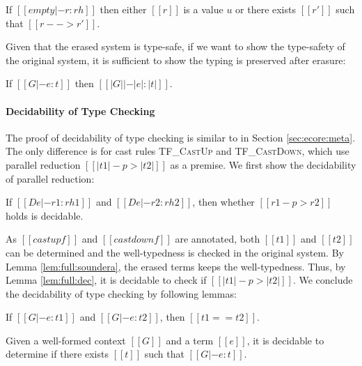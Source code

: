 \begin{theorem}\label{lem:full:prog}
  If $[[empty |- r:rh]]$ then either $[[r]]$ is a value $u$ or there
  exists $[[r']]$ such that $[[r --> r']]$.
\end{theorem}

Given that the erased system is type-safe, if we want to show the
type-safety of the original system, it is sufficient to show the typing
is preserved after erasure:

\begin{lemma}\label{lem:full:soundera}
If $[[G |- e : t]]$ then $[[|G| |- |e| : |t|]]$.
\end{lemma}

\paragraph{Decidability of Type Checking}
The proof of decidability of type checking \namef is similar to \ecore
in Section \ref{sec:ecore:meta}. The only difference is for cast rules
\textsc{TF\_CastUp} and \textsc{TF\_CastDown}, which use parallel
reduction $[[|t1| -p> |t2|]]$ as a premise. We first show the
decidability of parallel reduction:

\begin{lemma}\label{lem:full:dec}
  If $[[De |- r1 : rh1]]$ and $[[De |- r2 : rh2]]$, then whether
  $[[r1 -p> r2]]$ holds is decidable.
\end{lemma}

As $[[castupf]]$ and $[[castdownf]]$ are annotated, both $[[t1]]$ and
$[[t2]]$ can be determined and the well-typedness is checked in the
original system. By Lemma \ref{lem:full:soundera}, the erased terms
keeps the well-typedness. Thus, by Lemma \ref{lem:full:dec}, it is
decidable to check if $[[|t1| -p> |t2|]]$. We conclude the
decidability of type checking by following lemmas:

\begin{lemma}
If $[[G |- e : t1]]$ and $[[G |- e : t2]]$, then $[[t1 == t2]]$.
\end{lemma}

\begin{theorem}\label{lem:ecore:decide}
Given a well-formed context $[[G]]$ and a term $[[e]]$, it is decidable
to determine if there exists $[[t]]$ such that $[[G |- e : t]]$.
\end{theorem}

